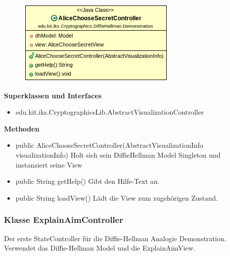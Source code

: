 \documentclass{article}
\begin{document}
      \begin{figure}[H]
        \centering
        \includegraphics[width=\textwidth]{resources/edu-kit-iks-Cryptographics-DiffieHellman-Demonstration-AliceChooseSecretController}
      \end{figure}

      \textbf{Superklassen und Interfaces}
      \begin{itemize}
        \item edu.kit.iks.CryptographicsLib.AbstractVisualizationController
      \end{itemize}

      \textbf{Methoden}
      \begin{itemize}
          \item public AliceChooseSecretController(AbstractVisualizationInfo visualizationInfo) \newline
              Holt sich sein DiffieHellman Model Singleton und instanziert seine View
        \item public String getHelp() \newline
        Gibt den Hilfe-Text an.
        \item public String loadView() \newline
        Lädt die View zum zugehörigen Zustand.
      \end{itemize}

\subsubsection{Klasse ExplainAimController}
      Der erste StateController für die Diffie-Hellman Analogie Demonstration.
      Verwendet das Diffie-Hellman Model und die ExplainAimView.
\end{document}
